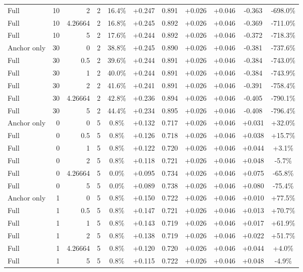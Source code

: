 \begin{table}[htbp]
\begin{tabular}{lrrrccccccc}
Full & 10 & 2 & 2 & 16.4\% & +0.247 & 0.891 & +0.026 & +0.046 & -0.363 & -698.0\% \\
Full & 10 & 4.26664 & 2 & 16.8\% & +0.245 & 0.892 & +0.026 & +0.046 & -0.369 & -711.0\% \\
Full & 10 & 5 & 2 & 17.6\% & +0.244 & 0.892 & +0.026 & +0.046 & -0.372 & -718.3\% \\
Anchor only & 30 & 0 & 2 & 38.8\% & +0.245 & 0.890 & +0.026 & +0.046 & -0.381 & -737.6\% \\
Full & 30 & 0.5 & 2 & 39.6\% & +0.244 & 0.891 & +0.026 & +0.046 & -0.384 & -743.0\% \\
Full & 30 & 1 & 2 & 40.0\% & +0.244 & 0.891 & +0.026 & +0.046 & -0.384 & -743.9\% \\
Full & 30 & 2 & 2 & 41.6\% & +0.241 & 0.891 & +0.026 & +0.046 & -0.391 & -758.4\% \\
Full & 30 & 4.26664 & 2 & 42.8\% & +0.236 & 0.894 & +0.026 & +0.046 & -0.405 & -790.1\% \\
Full & 30 & 5 & 2 & 44.4\% & +0.234 & 0.895 & +0.026 & +0.046 & -0.408 & -796.4\% \\
Anchor only & 0 & 0 & 5 & 0.8\% & +0.132 & 0.717 & +0.026 & +0.046 & +0.031 & +32.0\% \\
Full & 0 & 0.5 & 5 & 0.8\% & +0.126 & 0.718 & +0.026 & +0.046 & +0.038 & +15.7\% \\
Full & 0 & 1 & 5 & 0.8\% & +0.122 & 0.720 & +0.026 & +0.046 & +0.044 & +3.1\% \\
Full & 0 & 2 & 5 & 0.8\% & +0.118 & 0.721 & +0.026 & +0.046 & +0.048 & -5.7\% \\
Full & 0 & 4.26664 & 5 & 0.0\% & +0.095 & 0.734 & +0.026 & +0.046 & +0.075 & -65.8\% \\
Full & 0 & 5 & 5 & 0.0\% & +0.089 & 0.738 & +0.026 & +0.046 & +0.080 & -75.4\% \\
Anchor only & 1 & 0 & 5 & 0.8\% & +0.150 & 0.722 & +0.026 & +0.046 & +0.010 & +77.5\% \\
Full & 1 & 0.5 & 5 & 0.8\% & +0.147 & 0.721 & +0.026 & +0.046 & +0.013 & +70.7\% \\
Full & 1 & 1 & 5 & 0.8\% & +0.143 & 0.719 & +0.026 & +0.046 & +0.017 & +61.9\% \\
Full & 1 & 2 & 5 & 0.8\% & +0.138 & 0.719 & +0.026 & +0.046 & +0.022 & +51.7\% \\
Full & 1 & 4.26664 & 5 & 0.8\% & +0.120 & 0.720 & +0.026 & +0.046 & +0.044 & +4.0\% \\
Full & 1 & 5 & 5 & 0.8\% & +0.115 & 0.722 & +0.026 & +0.046 & +0.048 & -4.9\% \\

\end{tabular}
\end{table}
